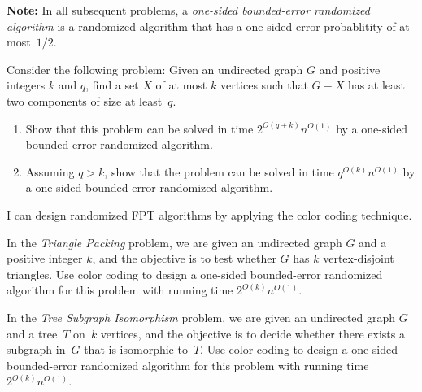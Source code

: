 \documentclass[english]{uebung_cs}
\begin{document}
\textbf{Note:} In all subsequent problems, a \emph{one-sided bounded-error randomized algorithm} is a randomized algorithm that has a one-sided error probablitity of at most~$1/2$.

\begin{exercise}[][\hard]
  Consider the following problem: Given an undirected graph $G$ and positive integers $k$ and $q$, find a set $X$ of at most $k$ vertices such that $G - X$ has at least two components of size at least~$q$.
  \begin{enumerate}
  \item Show that this problem can be solved in time $2^{O(q+k)}n^{O(1)}$ by a one-sided bounded-error randomized algorithm.
  \item Assuming $q>k$, show that the problem can be solved in time $q^{O(k)}n^{O(1)}$ by a one-sided bounded-error randomized algorithm.
  \end{enumerate}
\end{exercise}
  
\begin{skill}
  I can design randomized FPT algorithms by applying the color coding technique.
\end{skill}

\begin{exercise}
In the \emph{Triangle Packing} problem, we are given an undirected graph $G$ and a positive integer $k$, and the objective is to test whether $G$ has $k$ vertex-disjoint triangles. Use color coding to design a one-sided bounded-error randomized algorithm for this problem with running time $2^{O(k)} n^{O(1)}$.
\end{exercise}


\begin{exercise}
In the \emph{Tree Subgraph Isomorphism} problem, we are given an undirected graph $G$ and a tree~$T$ on~$k$ vertices, and the objective is to decide whether there exists a subgraph in~$G$ that is isomorphic to~$T$. Use color coding to design a one-sided bounded-error randomized algorithm for this problem with running time $2^{O(k)}n^{O(1)}$.
\end{exercise}
\end{document}
